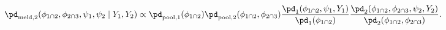 \begin{equation}
  \pd_{\text{meld}, 2} (\phi_{1 \cap 2}, \phi_{2 \cap 3}, \psi_{1}, \psi_{2} \mid Y_{1}, Y_{2}) \propto
  \pd_{\text{pool}, 1}(\phi_{1 \cap 2})
  \pd_{\text{pool}, 2}(\phi_{1 \cap 2}, \phi_{2 \cap 3})
  \frac {
    \pd_{1}(\phi_{1 \cap 2}, \psi_{1}, Y_{1})
  } {
    \pd_{1}(\phi_{1 \cap 2})
  }
  \frac {
    \pd_{2} (\phi_{1 \cap 2}, \phi_{2 \cap 3}, \psi_{2}, Y_{2})
  } {
    \pd_{2}(\phi_{1 \cap 2}, \phi_{2 \cap 3})
  }.
  \label{eqn:stage-two-target}
\end{equation}